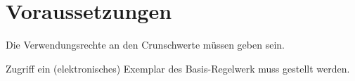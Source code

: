 \section{Voraussetzungen}
\label{sec:voraussetzungen}

{\color{red}
Die Verwendungsrechte an den Crunschwerte müssen geben sein.

Zugriff \bzw ein (elektronisches) Exemplar des Basis-Regelwerk muss gestellt werden.
}
